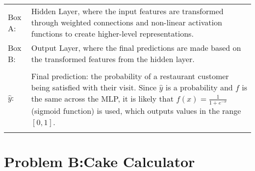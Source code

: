 \documentclass{solutionclass} %
\begin{document}
\begin{solution}
\begin{tabular}{p{3cm} p{11cm}}
            \large{Box A:} & Hidden Layer, where the input features are transformed through weighted connections and non-linear activation functions to create higher-level representations.
            \vspace{0.7cm} \\
            
            \large{Box B:} & Output Layer, where the final predictions are made based on the transformed features from the hidden layer. \\
            \vspace{0.7cm} \\

            \Large{$\hat{y}:$} & Final prediction: the probability of a restaurant customer being satisfied with their visit. Since $\hat{y}$ is a probability and $f$ is the same across the MLP, it is likely that $f(x)=\frac{1}{1+e^{-x}}$ (sigmoid function) is used, which outputs values in the range $[0, 1]$. \\ \\

        \end{tabular}
    \end{solution}

    \divider%

    \section{Problem B:\@ Cake Calculator}
\end{document}
